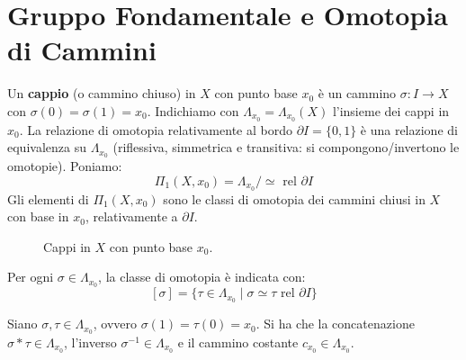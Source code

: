 \section{Gruppo Fondamentale e Omotopia di Cammini}

Un \textbf{cappio} (o cammino chiuso) in $X$ con punto base $x_0$ \`e un cammino $\sigma: I \to X$ con $\sigma(0) = \sigma(1) = x_0$. Indichiamo con $\Lambda_{x_0} = \Lambda_{x_0}(X)$ l'insieme dei cappi in $x_0$. La relazione di omotopia relativamente al bordo $\partial I = \{0,1\}$ \`e una relazione di equivalenza su $\Lambda_{x_0}$ (riflessiva, simmetrica e transitiva: si compongono/invertono le omotopie). Poniamo:
\[
\Pi_1(X, x_0) = \Lambda_{x_0} \big/ \!\simeq \text{ rel } \partial I
\]
Gli elementi di $\Pi_1(X, x_0)$ sono le classi di omotopia dei cammini chiusi in $X$ con base in $x_0$, relativamente a $\partial I$.

\begin{figure}[H]
    \centering
    \caption{Cappi in $X$ con punto base $x_0$.}
\end{figure}

Per ogni $\sigma \in \Lambda_{x_0}$, la classe di omotopia è indicata con:
\[
[\sigma] = \{ \tau \in \Lambda_{x_0} \mid \sigma \simeq \tau \text{ rel } \partial I \}
\]

\begin{observacion}
Siano $\sigma, \tau \in \Lambda_{x_0}$, ovvero $\sigma(1) = \tau(0) = x_0$.
Si ha che la concatenazione $\sigma * \tau \in \Lambda_{x_0}$, l'inverso $\sigma^{-1} \in \Lambda_{x_0}$ e il cammino costante $c_{x_0} \in \Lambda_{x_0}$.
\end{observacion}

